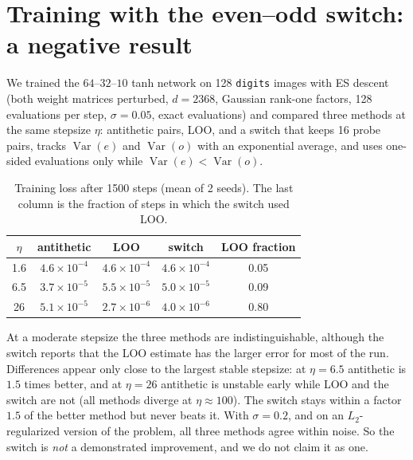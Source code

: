 \documentclass[11pt]{article}
\theoremstyle{remark}
\DeclareMathOperator{\Var}{Var}
\begin{document}
\section{Training with the even--odd switch: a negative result}\label{sec:train}
We trained the $64$--$32$--$10$ tanh network on 128 \texttt{digits} images with ES descent (both weight matrices perturbed, $d=2368$, Gaussian rank-one factors, 128 evaluations per step, $\sigma=0.05$, exact evaluations) and compared three methods at the same stepsize $\eta$: antithetic pairs, LOO, and a switch that keeps 16 probe pairs, tracks $\Var(e)$ and $\Var(o)$ with an exponential average, and uses one-sided evaluations only while $\Var(e)<\Var(o)$.

\begin{table}[H]
\centering\small
\caption{Training loss after 1500 steps (mean of 2 seeds). The last column is the fraction of steps in which the switch used LOO.}\label{tab:train}
\begin{tabular}{ccccc}
\toprule
$\eta$ & antithetic & LOO & switch & LOO fraction\\
\midrule
1.6 & $4.6\times10^{-4}$ & $4.6\times10^{-4}$ & $4.6\times10^{-4}$ & 0.05\\
6.5 & $3.7\times10^{-5}$ & $5.5\times10^{-5}$ & $5.0\times10^{-5}$ & 0.09\\
26 & $5.1\times10^{-5}$ & $2.7\times10^{-6}$ & $4.0\times10^{-6}$ & 0.80\\
\bottomrule
\end{tabular}
\end{table}
At a moderate stepsize the three methods are indistinguishable, although the switch reports that the LOO estimate has the larger error for most of the run. Differences appear only close to the largest stable stepsize: at $\eta=6.5$ antithetic is $1.5$ times better, and at $\eta=26$ antithetic is unstable early while LOO and the switch are not (all methods diverge at $\eta\approx100$). The switch stays within a factor $1.5$ of the better method but never beats it. With $\sigma=0.2$, and on an $L_2$-regularized version of the problem, all three methods agree within noise. So the switch is \emph{not} a demonstrated improvement, and we do not claim it as one.
\end{document}
